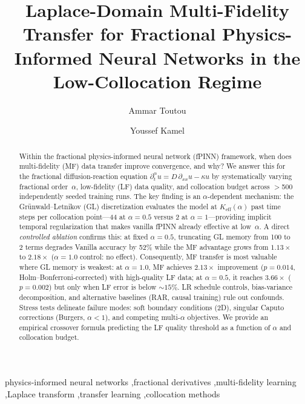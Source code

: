\documentclass[preprint,12pt]{elsarticle}
\begin{document}
\begin{frontmatter}

\title{Laplace-Domain Multi-Fidelity Transfer for Fractional Physics-Informed Neural Networks in the Low-Collocation Regime}

\author[uaeu]{Ammar Toutou}
\author[uaeu]{Youssef Kamel}
\address[uaeu]{}

\begin{abstract}
Within the fractional physics-informed neural network (fPINN) framework, when does multi-fidelity (MF) data transfer improve convergence, and why? We answer this for the fractional diffusion-reaction equation $\partial_t^\alpha u = D\,\partial_{xx} u - \kappa u$ by systematically varying fractional order~$\alpha$, low-fidelity (LF) data quality, and collocation budget across $>$500 independently seeded training runs. The key finding is an $\alpha$-dependent mechanism: the Gr\"unwald--Letnikov (GL) discretization evaluates the model at $K_{\mathrm{eff}}(\alpha)$ past time steps per collocation point---44 at $\alpha = 0.5$ versus 2 at $\alpha = 1$---providing implicit temporal regularization that makes vanilla fPINN already effective at low~$\alpha$. A direct \emph{controlled ablation} confirms this: at fixed $\alpha = 0.5$, truncating GL memory from 100 to 2 terms degrades Vanilla accuracy by 52\% while the MF advantage grows from $1.13\times$ to $2.18\times$ ($\alpha =1.0$ control: no effect). Consequently, MF transfer is most valuable where GL memory is weakest: at $\alpha = 1.0$, MF achieves $2.13\times$ improvement ($p = 0.014$, Holm--Bonferroni-corrected) with high-quality LF data; at $\alpha = 0.5$, it reaches $3.66\times$ ($p = 0.002$) but only when LF error is below ${\sim}15\%$. LR schedule controls, bias-variance decomposition, and alternative baselines (RAR, causal training) rule out confounds. Stress tests delineate failure modes: soft boundary conditions (2D), singular Caputo corrections (Burgers, $\alpha < 1$), and competing multi-$\alpha$ objectives. We provide an empirical crossover formula predicting the LF quality threshold as a function of $\alpha$ and collocation budget.
\end{abstract}

\begin{keyword}
physics-informed neural networks \sep fractional derivatives \sep multi-fidelity learning \sep Laplace transform \sep transfer learning \sep collocation methods
\end{keyword}

\end{frontmatter}
\end{document}
